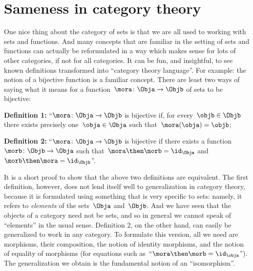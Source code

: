 \label{sec:attributes_sameness}

\section{Sameness in category theory}

One nice thing about the category of sets is that we are all used to working with sets and functions. And many concepts that are familiar in the setting of sets and functions can actually be reformulated in a way which makes sense for lots of other categories, if not for all categories. It can be fun, and insightful, to see known definitions transformed into ``category theory language''. For example: the notion of a bijective function is a familiar concept. There are least two ways of saying what it means for a function~$\mora \colon \Obja \to \Objb$ of sets to be bijective:

\textbf{Definition 1:} ``$\mora \colon \Obja \to \Objb$ is bijective if, for every~$\objb \in \Objb$ there exists precisely one~$\obja \in \Obja$ such that~$\mora(\obja) = \objb$;


\textbf{Definition 2:} ``$\mora\colon \Obja \to \Objb$ is bijective if there exists a function~$\morb\colon \Objb \to \Obja$ such that~$\mora \then \morb = \id_\Obja$ and~$\morb \then \mora = \id_\Objb$''.


It is a short proof to show that the above two definitions are equivalent. The first definition, however, does not lend itself well to generalization in category theory, because it is formulated using something that is very specific to sets: namely, it refers to \emph{elements} of the sets~$\Obja$ and~$\Objb$. And we have seen that the objects of a category need not be sets, and so in general we cannot speak of ``elements'' in the usual sense. Definition 2, on the other hand, can easily be generalized to work in any category. To formulate this version, all we need are morphisms, their composition, the notion of identity morphisms, and the notion of equality of morphisms (for equations such as~``$\mora \then \morb = \id_\obja$''). The generalization we obtain is the fundamental notion of an ``isomorphism''.



